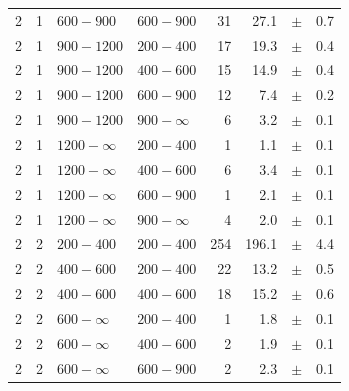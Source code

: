 \begin{table}[!h]
\begin{tabular}{rrllrrcl}
2 & 1 & $ 600- 900$ & $600-900$ &     31 &     27.1 &$\pm$&    0.7 \\
2 & 1 & $ 900-1200$ & $200-400$ &     17 &     19.3 &$\pm$&    0.4 \\
2 & 1 & $ 900-1200$ & $400-600$ &     15 &     14.9 &$\pm$&    0.4 \\
2 & 1 & $ 900-1200$ & $600-900$ &     12 &      7.4 &$\pm$&    0.2 \\
2 & 1 & $ 900-1200$ & $900-\infty$ &      6 &      3.2 &$\pm$&    0.1 \\
2 & 1 & $1200- \infty$ & $200-400$ &      1 &      1.1 &$\pm$&    0.1 \\
2 & 1 & $1200- \infty$ & $400-600$ &      6 &      3.4 &$\pm$&    0.1 \\
2 & 1 & $1200- \infty$ & $600-900$ &      1 &      2.1 &$\pm$&    0.1 \\
2 & 1 & $1200- \infty$ & $900-\infty$ &      4 &      2.0 &$\pm$&    0.1 \\
2 & 2 & $ 200- 400$ & $200-400$ &    254 &    196.1 &$\pm$&    4.4 \\
2 & 2 & $ 400- 600$ & $200-400$ &     22 &     13.2 &$\pm$&    0.5 \\
2 & 2 & $ 400- 600$ & $400-600$ &     18 &     15.2 &$\pm$&    0.6 \\
2 & 2 & $ 600- \infty$ & $200-400$ &      1 &      1.8 &$\pm$&    0.1 \\
2 & 2 & $ 600- \infty$ & $400-600$ &      2 &      1.9 &$\pm$&    0.1 \\
2 & 2 & $ 600- \infty$ & $600-900$ &      2 &      2.3 &$\pm$&    0.1 \\
    \hline
  \end{tabular}
\end{table}

